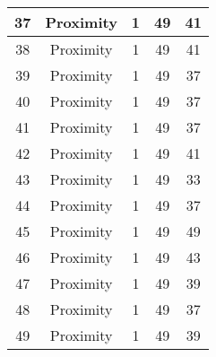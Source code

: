 \documentclass[results.tex]{subfiles}
\begin{document}
\begin{center}
\begin{tabular}{| c || c | c | c | c |}
            \hline
            37                      & Proximity                    & 1                      & 49                      & 41                   \\
            \hline
            38                      & Proximity                    & 1                      & 49                      & 41                   \\
            \hline
            39                      & Proximity                    & 1                      & 49                      & 37                   \\
            \hline
            40                      & Proximity                    & 1                      & 49                      & 37                   \\
            \hline
            41                      & Proximity                    & 1                      & 49                      & 37                   \\
            \hline
            42                      & Proximity                    & 1                      & 49                      & 41                   \\
            \hline
            43                      & Proximity                    & 1                      & 49                      & 33                   \\
            \hline
            44                      & Proximity                    & 1                      & 49                      & 37                   \\
            \hline
            45                      & Proximity                    & 1                      & 49                      & 49                   \\
            \hline
            46                      & Proximity                    & 1                      & 49                      & 43                   \\
            \hline
            47                      & Proximity                    & 1                      & 49                      & 39                   \\
            \hline
            48                      & Proximity                    & 1                      & 49                      & 37                   \\
            \hline
            49                      & Proximity                    & 1                      & 49                      & 39                   \\
            \hline
        \end{tabular}
    \end{center}
\end{document}
